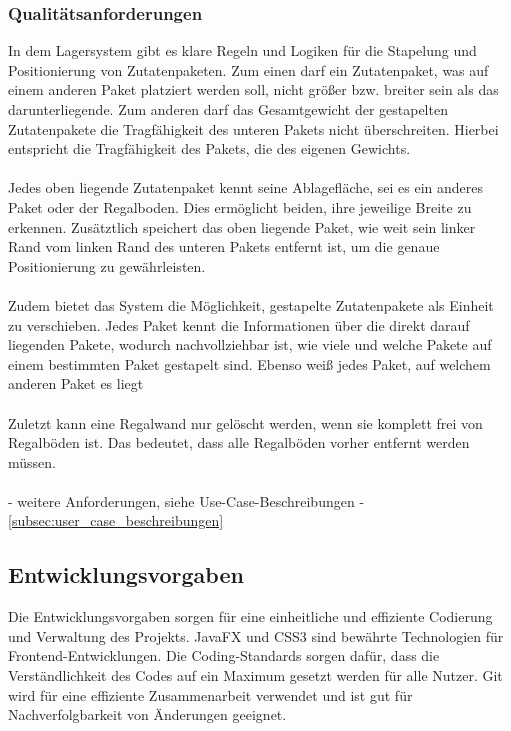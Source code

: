 \subsubsection{Qualitätsanforderungen}

In dem Lagersystem gibt es klare Regeln und Logiken für die Stapelung und Positionierung von Zutatenpaketen.
Zum einen darf ein Zutatenpaket, was auf einem anderen Paket platziert werden soll, nicht größer bzw. breiter sein als das darunterliegende.
Zum anderen darf das Gesamtgewicht der gestapelten Zutatenpakete die Tragfähigkeit des unteren Pakets nicht überschreiten.
Hierbei entspricht die Tragfähigkeit des Pakets, die des eigenen Gewichts.\\
\\
Jedes oben liegende Zutatenpaket kennt seine Ablagefläche, sei es ein anderes Paket oder der Regalboden. Dies ermöglicht beiden,
ihre jeweilige Breite zu erkennen. Zusätztlich speichert das oben liegende Paket, wie weit sein linker Rand vom linken Rand
des unteren Pakets entfernt ist, um die genaue Positionierung zu gewährleisten.\\
\\
Zudem bietet das System die Möglichkeit, gestapelte Zutatenpakete als Einheit zu verschieben. Jedes Paket kennt die Informationen
über die direkt darauf liegenden Pakete, wodurch nachvollziehbar ist, wie viele und welche Pakete auf einem bestimmten Paket gestapelt sind.
Ebenso weiß jedes Paket, auf welchem anderen Paket es liegt\\
\\
Zuletzt kann eine Regalwand nur gelöscht werden, wenn sie komplett frei von Regalböden ist. Das bedeutet, dass alle Regalböden vorher entfernt werden müssen.\\
\\

- weitere Anforderungen, siehe Use-Case-Beschreibungen -\ref{subsec:user_case_beschreibungen}\\

\subsection{Entwicklungsvorgaben}
Die Entwicklungsvorgaben sorgen für eine einheitliche und effiziente Codierung und Verwaltung des Projekts. JavaFX und CSS3 sind
bewährte Technologien für Frontend-Entwicklungen. Die Coding-Standards sorgen dafür, dass die Verständlichkeit des Codes auf
ein Maximum gesetzt werden für alle Nutzer. Git wird für eine effiziente Zusammenarbeit verwendet und ist gut für Nachverfolgbarkeit von Änderungen geeignet.

